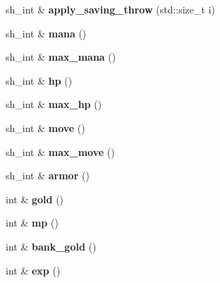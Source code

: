 \begin{DoxyCompactItemize}
sh\+\_\+int \& {\bfseries apply\+\_\+saving\+\_\+throw} (std\+::size\+\_\+t i)
\item 
\mbox{\label{classmods_1_1player_a51c04c6fbc693242bff75b4c5f7a6f20}} 
sh\+\_\+int \& {\bfseries mana} ()
\item 
\mbox{\label{classmods_1_1player_a5f33702911d5388a841c18fea85fc1f4}} 
sh\+\_\+int \& {\bfseries max\+\_\+mana} ()
\item 
\mbox{\label{classmods_1_1player_aeb9f1fcb518628ff9c9e5b801edbefa2}} 
sh\+\_\+int \& {\bfseries hp} ()
\item 
\mbox{\label{classmods_1_1player_a53bab528eede0206aaabac039eae01f1}} 
sh\+\_\+int \& {\bfseries max\+\_\+hp} ()
\item 
\mbox{\label{classmods_1_1player_a55c765377a7065cce535eb1513cde195}} 
sh\+\_\+int \& {\bfseries move} ()
\item 
\mbox{\label{classmods_1_1player_aecc04f7e551f70f6273f117ac1b7ca08}} 
sh\+\_\+int \& {\bfseries max\+\_\+move} ()
\item 
\mbox{\label{classmods_1_1player_a7d381a08bf3e27ce1a6984e1cb29c7bd}} 
sh\+\_\+int \& {\bfseries armor} ()
\item 
\mbox{\label{classmods_1_1player_adaea8d2fa69b3dfb19de199a269fe5e7}} 
int \& {\bfseries gold} ()
\item 
\mbox{\label{classmods_1_1player_a2c04452f76ecd008230cb842a58f44b4}} 
int \& {\bfseries mp} ()
\item 
\mbox{\label{classmods_1_1player_a5b1cabaee05e10fc2d43edd0a6d2ae60}} 
int \& {\bfseries bank\+\_\+gold} ()
\item 
\mbox{\label{classmods_1_1player_a57d3582952045068f8e4db98821b235e}} 
int \& {\bfseries exp} ()
\item 
\mbox{\label{classmods_1_1player_ae0882e40b22814e55b10bc8d900c4169}} 

\end{DoxyCompactItemize}
